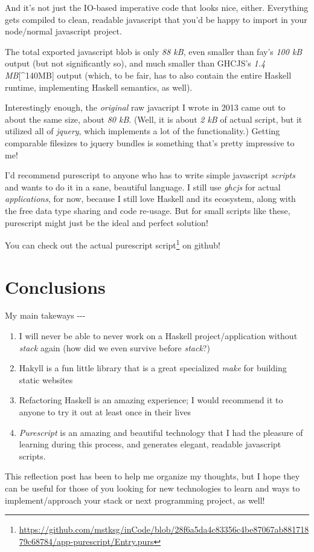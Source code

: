 \documentclass[]{article}
\renewcommand{\href}[2]{#2\footnote{\url{#1}}}
\begin{document}
And it's not just the IO-based imperative code that looks nice, either.
Everything gets compiled to clean, readable javascript that you'd be happy to
import in your node/normal javascript project.

The total exported javascript blob is only \emph{88 kB}, even smaller than fay's
\emph{100 kB} output (but not significantly so), and much smaller than GHCJS's
\emph{1.4 MB}{[}\^{}140MB{]} output (which, to be fair, has to also contain the
entire Haskell runtime, implementing Haskell semantics, as well).

Interestingly enough, the \emph{original} raw javacript I wrote in 2013 came out
to about the same size, about \emph{80 kB}. (Well, it is about \emph{2 kB} of
actual script, but it utilized all of \emph{jquery}, which implements a lot of
the functionality.) Getting comparable filesizes to jquery bundles is something
that's pretty impressive to me!

I'd recommend purescript to anyone who has to write simple javascript
\emph{scripts} and wants to do it in a sane, beautiful language. I still use
\emph{ghcjs} for actual \emph{applications}, for now, because I still love
Haskell and its ecosystem, along with the free data type sharing and code
re-usage. But for small scripts like these, purescript might just be the ideal
and perfect solution!

You can check out
\href{https://github.com/mstksg/inCode/blob/28f6a5da4c83356c4be87067ab88171879c68784/app-purescript/Entry.purs}{the
actual purescript script} on github!

\section{Conclusions}

My main takeways -\/-\/-

\begin{enumerate}
\tightlist
\item
  I will never be able to never work on a Haskell project/application without
  \emph{stack} again (how did we even survive before \emph{stack}?)
\item
  Hakyll is a fun little library that is a great specialized \emph{make} for
  building static websites
\item
  Refactoring Haskell is an amazing experience; I would recommend it to anyone
  to try it out at least once in their lives
\item
  \emph{Purescript} is an amazing and beautiful technology that I had the
  pleasure of learning during this process, and generates elegant, readable
  javascript scripts.
\end{enumerate}

This reflection post has been to help me organize my thoughts, but I hope they
can be useful for those of you looking for new technologies to learn and ways to
implement/approach your stack or next programming project, as well!
\end{document}
